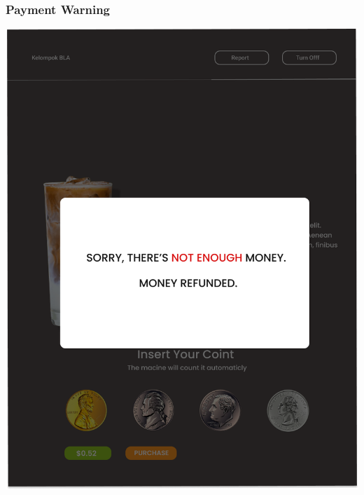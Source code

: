 \documentclass[12pt]{article}
\begin{document}
\subsubsection{Payment Warning}
\includegraphics[width=1\linewidth]{./img/Payment-1.png}
\end{document}
